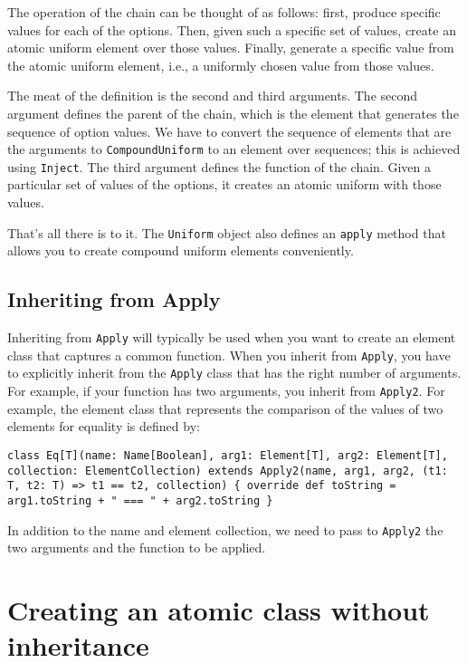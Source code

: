 The operation of the chain can be thought of as follows: first, produce specific values for each of the options. Then, given such a specific set of values, create an atomic uniform element over those values. Finally, generate a specific value from the atomic uniform element, i.e., a uniformly chosen value from
those values.

The meat of the definition is the second and third arguments. The second argument defines the parent of the chain, which is the element that generates the sequence of option values. We have to convert the sequence of elements that are the arguments to \texttt{CompoundUniform} to an element over sequences; this is achieved using \texttt{Inject}. The third argument defines the function of the chain. Given a particular set of values of the options, it creates an atomic uniform with those values.

That's all there is to it. The \texttt{Uniform} object also defines an \texttt{apply} method that allows you to create compound uniform elements conveniently.

\subsection{Inheriting from Apply}

Inheriting from \texttt{Apply} will typically be used when you want to create an element class that captures a common function. When you inherit from \texttt{Apply}, you have to explicitly inherit from the \texttt{Apply} class that has the right number of arguments. For example, if your function has two arguments, you inherit from \texttt{Apply2}. For example, the element class that represents the comparison of the values of two elements for equality is defined by:

\begin{flushleft}
\texttt{class Eq[T](name: Name[Boolean], arg1: Element[T], arg2: Element[T], \newline collection: ElementCollection) extends Apply2(name, arg1, arg2, (t1: T, t2: T) => t1 == t2, collection) \{
\newline \tab override def toString = arg1.toString + " === " + arg2.toString
\newline \}
}
\end{flushleft}

In addition to the name and element collection, we need to pass to \texttt{Apply2} the two arguments and the function to be applied.

\section{Creating an atomic class without inheritance}

